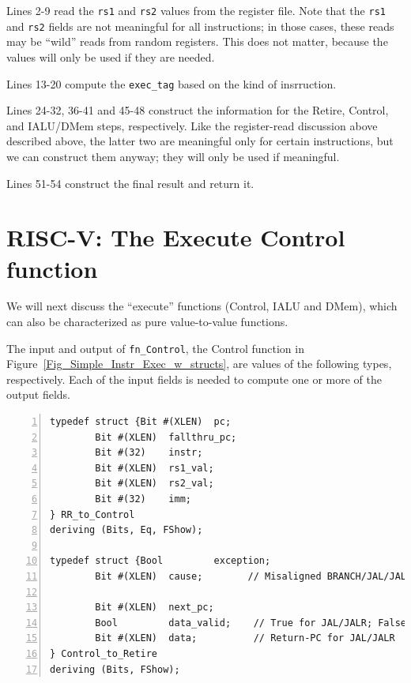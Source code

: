 Lines 2-9 read the \verb|rs1| and \verb|rs2| values from the register
file.  Note that the \verb|rs1| and \verb|rs2| fields are not
meaningful for all instructions; in those cases, these reads may be
``wild'' reads from random registers.  This does not matter, because
the values will only be used if they are needed.

Lines 13-20 compute the \verb|exec_tag| based on the kind of
insrruction.

Lines 24-32, 36-41 and 45-48 construct the information for the Retire,
Control, and IALU/DMem steps, respectively.  Like the register-read
discussion above described above, the latter two are meaningful only
for certain instructions, but we can construct them anyway; they will
only be used if meaningful.

Lines 51-54 construct the final result and return it.


\section{RISC-V: The Execute Control function}

\label{Sec_Control_function}


We will next discuss the ``execute'' functions (Control, IALU and
DMem), which can also be characterized as pure value-to-value
functions.

The input and output of \verb|fn_Control|, the Control function in
Figure~\ref{Fig_Simple_Instr_Exec_w_structs}, are values of the
following types, respectively.  Each of the input fields is needed to
compute one or more of the output fields.

{\small
\begin{Verbatim}[frame=single, numbers=left]
typedef struct {Bit #(XLEN)  pc;
		Bit #(XLEN)  fallthru_pc;
		Bit #(32)    instr;
		Bit #(XLEN)  rs1_val;
		Bit #(XLEN)  rs2_val;
		Bit #(32)    imm;
} RR_to_Control
deriving (Bits, Eq, FShow);

typedef struct {Bool         exception;
		Bit #(XLEN)  cause;        // Misaligned BRANCH/JAL/JALR target

		Bit #(XLEN)  next_pc;
		Bool         data_valid;    // True for JAL/JALR; False for BRANCH
		Bit #(XLEN)  data;          // Return-PC for JAL/JALR
} Control_to_Retire
deriving (Bits, FShow);
\end{Verbatim}
}

